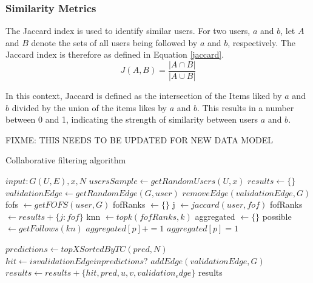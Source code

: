 \subsubsection{Similarity Metrics}
The Jaccard index is used to identify similar users. For two users, $a$ and $b$, let $A$ and $B$ denote the sets of all users being followed by $a$ and $b$, respectively. The Jaccard index is therefore as defined in Equation \ref{jaccard}.
\begin{equation}
\label{jaccard}
J(A,B) = \frac{|A \cap B|}{|A \cup B|}
\end{equation}

In this context, Jaccard is defined as the intersection of the Items liked by $a$ and $b$ divided by the union of the items likes by $a$ and $b$. This results in a number between 0 and 1, indicating the strength of similarity between users $a$ and $b$.
 
%
%   
%  

FIXME: THIS NEEDS TO BE UPDATED FOR NEW DATA MODEL
\begin{algorithm}
\caption{Collaborative filtering algorithm}\label{algo1}
\begin{algorithmic}[1]
\State $input: G(U, E), x, N$ 
\State $usersSample \gets getRandomUsers(U,x)$
\State $results \gets \{\}$
	\State $validationEdge \gets getRandomEdge(G, user)$
	\State $removeEdge(validationEdge,G)$
	\State fofs $\gets getFOFS(user, G)$
	\State fofRanks $ \gets \{\}$
		\State j $\gets jaccard(user, fof)$
		fofRanks $\gets results + \{j : fof\}$
	\EndFor
	\State knn $\gets topk(fofRanks, k)$
	\State aggregated $\gets \{\}$
		\State possible $\gets getFollows(kn)$
			 $aggregated[p] += 1$ 
			\Else 
				\State $aggregated[p] = 1$
			\EndIf
		\EndFor
	\EndFor
	
	\State $predictions \gets topXSortedByTC(pred, N)$
	\State $hit \gets is validationEdge in predictions?$
	\State $addEdge(validationEdge, G)$
	\State $results \gets results + \{hit, pred, u, v, validation_edge\}$
\EndFor
\State \Return results
\end{algorithmic}
\end{algorithm}

